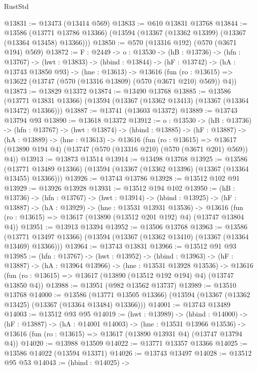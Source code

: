 \begin{lexlean}{RustStd}
\begin{coremodule}
@13831 := @13473 (@13414 @569)
@13833 := @610 @13831 @13768
@13844 := @13586
    (@13771 @13786 @13366)
    (@13594 (@13367 (@13362 @13399) (@13367 (@13364 @13458) @13366)))
@13850 := @570 (@13316 @192) (@570 (@3671 @194) @569)
@13872 := {F : @2449} ->
  {o : @13530} ->
  (hB : @13736) ->
  (hfn : @13767) ->
  (hwt : @13833) ->
  (hbind : @13844) ->
  (hF : @13742) ->
  (hA : @13743 @13850 @93) ->
  (hne : @13613) ->
  @13616 (fun (ro : @13615) => @13622 (@13747 (@570 (@13316 @13809) (@570 (@3671 @210) @569)) @4))
@13873 := @13829 @13372
@13874 := @13490 @13768
@13885 := @13586
    (@13771 @13831 @13366)
    (@13594 (@13367 (@13362 @13413) (@13367 (@13364 @13472) @13366)))
@13887 := @13741 (@13603 @13372)
@13889 := @13743 @13794 @93
@13890 := @13618 @13372
@13912 := {o : @13530} ->
  (hB : @13736) ->
  (hfn : @13767) ->
  (hwt : @13874) ->
  (hbind : @13885) ->
  (hF : @13887) ->
  (hA : @13889) ->
  (hne : @13613) ->
  @13616
    (fun (ro : @13615) =>
    @13617 (@13890 @194 @4) (@13747 (@570 (@13316 @210) (@570 (@3671 @201) @569)) @4))
@13913 := @13873 @13514
@13914 := @13498 @13768
@13925 := @13586
    (@13771 @13489 @13366)
    (@13594 (@13367 (@13362 @13396) (@13367 (@13364 @13455) @13366)))
@13926 := @13743 @13786
@13928 := @13512 @102 @91
@13929 := @13926 @13928
@13931 := @13512 @194 @102
@13950 := (hB : @13736) ->
  (hfn : @13767) ->
  (hwt : @13914) ->
  (hbind : @13925) ->
  (hF : @13887) ->
  (hA : @13929) ->
  (hne : @13531 @13931 @13536) ->
  @13616 (fun (ro : @13615) => @13617 (@13890 (@13512 @201 @192) @4) (@13747 @13804 @4))
@13951 := @13913 @13394
@13952 := @13506 @13768
@13963 := @13586
    (@13771 @13497 @13366)
    (@13594 (@13367 (@13362 @13410) (@13367 (@13364 @13469) @13366)))
@13964 := @13743 @13831
@13966 := @13512 @91 @93
@13985 := (hfn : @13767) ->
  (hwt : @13952) ->
  (hbind : @13963) ->
  (hF : @13887) ->
  (hA : @13964 @13966) ->
  (hne : @13531 @13928 @13536) ->
  @13616 (fun (ro : @13615) => @13617 (@13890 (@13512 @192 @194) @4) (@13747 @13850 @4))
@13988 := @13951 (@982 @13562 @13737)
@13989 := @13510 @13768
@14000 := @13586
    (@13771 @13505 @13366)
    (@13594 (@13367 (@13362 @13425) (@13367 (@13364 @13484) @13366)))
@14001 := @13743 @13489
@14003 := @13512 @93 @95
@14019 := (hwt : @13989) ->
  (hbind : @14000) ->
  (hF : @13887) ->
  (hA : @14001 @14003) ->
  (hne : @13531 @13966 @13536) ->
  @13616 (fun (ro : @13615) => @13617 (@13890 @13931 @4) (@13747 @13794 @4))
@14020 := @13988 @13509
@14022 := @13771 @13357 @13366
@14025 := @13586 @14022 (@13594 @13371)
@14026 := @13743 @13497
@14028 := @13512 @95 @53
@14043 := (hbind : @14025) ->

\end{coremodule}
\end{lexlean}
